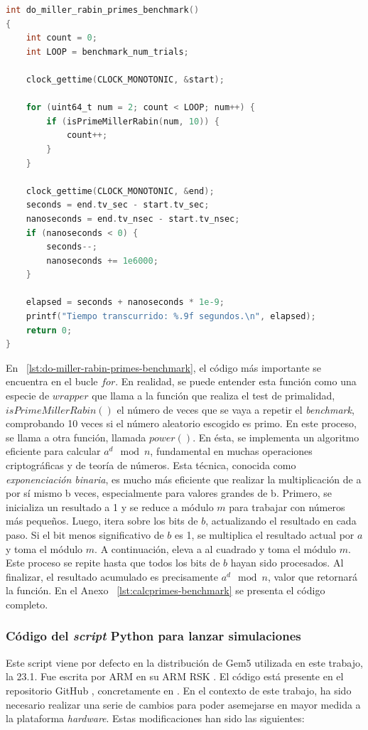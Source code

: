 \begin{lstlisting}[language=C,frame=single,caption={Código fuente la función $do\_miller\_rabin\_primes\_benchmark()$},showstringspaces=false,label=lst:do-miller-rabin-primes-benchmark]
int do_miller_rabin_primes_benchmark() 
{
    int count = 0;
    int LOOP = benchmark_num_trials;

    clock_gettime(CLOCK_MONOTONIC, &start);

    for (uint64_t num = 2; count < LOOP; num++) {
        if (isPrimeMillerRabin(num, 10)) {
            count++;
        }
    }

    clock_gettime(CLOCK_MONOTONIC, &end);
    seconds = end.tv_sec - start.tv_sec;
    nanoseconds = end.tv_nsec - start.tv_nsec;
    if (nanoseconds < 0) {
        seconds--;
        nanoseconds += 1e6000;
    }

    elapsed = seconds + nanoseconds * 1e-9;
    printf("Tiempo transcurrido: %.9f segundos.\n", elapsed);
    return 0;
}
\end{lstlisting}

\par{En ~\ref{lst:do-miller-rabin-primes-benchmark}, el código más importante se encuentra en el bucle $for$. En realidad, se puede entender esta función como una especie de $wrapper$ que llama a la función que realiza el test de primalidad, $isPrimeMillerRabin()$ el número de veces que se vaya a repetir el \textit{benchmark}, comprobando 10 veces si el número aleatorio escogido es primo. En este proceso, se llama a otra función, llamada $power()$. En ésta, se implementa un algoritmo eficiente para calcular $a^{d} \mod n$, fundamental en muchas operaciones criptográficas y de teoría de números. Esta técnica, conocida como \emph{exponenciación binaria}, es mucho más eficiente que realizar la multiplicación de a por sí mismo b veces, especialmente para valores grandes de b. Primero, se inicializa un resultado a 1 y se reduce a módulo $m$ para trabajar con números más pequeños. Luego, itera sobre los bits de $b$, actualizando el resultado en cada paso. Si el bit menos significativo de $b$ es 1, se multiplica el resultado actual por $a$ y toma el módulo $m$. A continuación, eleva a al cuadrado y toma el módulo $m$. Este proceso se repite hasta que todos los bits de $b$ hayan sido procesados. Al finalizar, el resultado acumulado es precisamente $a^{d} \mod n$, valor que retornará la función. En el Anexo ~\ref{lst:calcprimes-benchmark} se presenta el código completo.}

\subsubsection{Código del \textit{script} Python para lanzar simulaciones}
\label{subs:starterfs}
Este script viene por defecto en la distribución de Gem5 utilizada en este trabajo, la 23.1. Fue escrita por \ac{ARM} en su ARM \ac{RSK} \cite{arm-rsk}. El código está presente en el repositorio GitHub \cite{repoTFM}, concretamente en \cite{repoTFM-starterfs}. En el contexto de este trabajo, ha sido necesario realizar una serie de cambios para poder asemejarse en mayor medida a la plataforma \textit{hardware}. Estas modificaciones han sido las siguientes:

